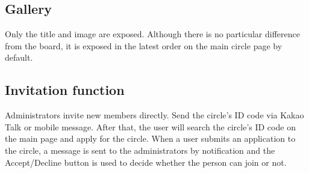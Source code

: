 \documentclass[conference]{IEEEtran}
\begin{document}
\subsection{Gallery}
Only the title and image are exposed. Although there is no particular difference from the board, it is exposed in the latest order on the main circle page by default.
\subsection{Invitation function}
Administrators invite new members directly. Send the circle's ID code via Kakao Talk or mobile message. After that, the user will search the circle's ID code on the main page and apply for the circle. When a user submits an application to the circle, a message is sent to the administrators by notification and the Accept/Decline button is used to decide whether the person can join or not.
\end{document}

